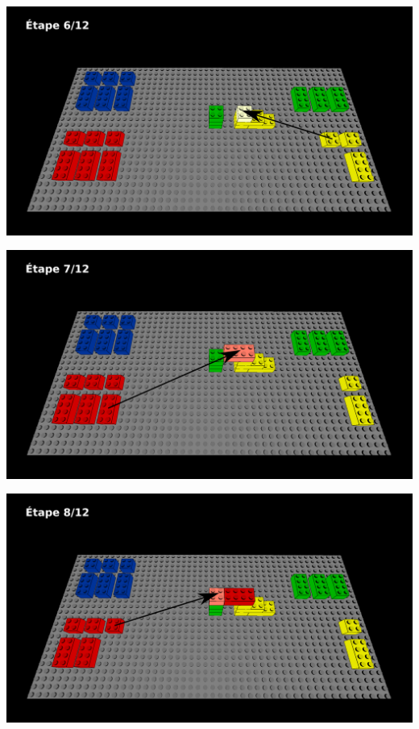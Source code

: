 \documentclass[aspectratio=169]{beamer}
\begin{document}
\begin{frame}
  \includegraphics[width=\linewidth]{step6.png}
\end{frame}

\begin{frame}
  \includegraphics[width=\linewidth]{step7.png}
\end{frame}

\begin{frame}
  \includegraphics[width=\linewidth]{step8.png}
\end{frame}
\end{document}
